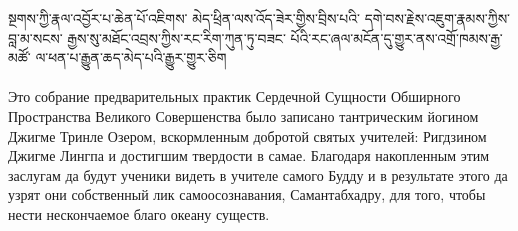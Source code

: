 སྔགས་ཀྱི་རྣལ་འབྱོར་པ་ཆེན་པོ་འཇིགས་
མེད་ཕྲིན་ལས་འོད་ཟེར་གྱིས་བྲིས་པའི་
དགེ་བས་རྗེས་འཇུག་རྣམས་ཀྱིས་བླ་མ་སངས་
རྒྱས་སུ་མཐོང་འབྲས་ཀྱིས་རང་རིག་ཀུན་ཏུ་བཟང་
པོའི་རང་ཞལ་མངོན་དུ་གྱུར་ནས་འགྲོ་ཁམས་རྒྱ་མཚོ་
ལ་ཕན་པ་རྒྱུན་ཆད་མེད་པའི་རྒྱུར་གྱུར་ཅིག\\
\\
\ru\scriptsize\noindent
Это собрание предварительных практик Сердечной Сущности
Об\-ширного Пространства Великого Совершенства было записано
тантри\-ческим йогином Джигме Тринле Озером,
вскормленным добротой святых учителей: Ригдзином Джигме Лингпа
и достигшим твердости в самае. Благодаря накопленным
этим заслугам да будут ученики видеть в учителе самого Будду
и в результате этого да узрят они собственный лик
самоосознавания, Самантабхадру, для того, чтобы нести
нескончаемое благо океану существ.

